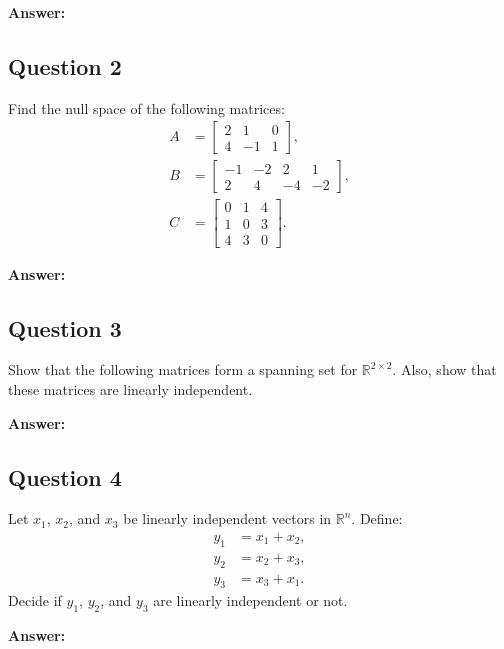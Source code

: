 \documentclass{article}
\begin{document}
\textbf{Answer:} 


\subsection*{Question 2}
Find the null space of the following matrices:
\begin{align*}
A &= \begin{bmatrix} 2 & 1 & 0 \\ 4 & -1 & 1 \end{bmatrix}, \\
B &= \begin{bmatrix} -1 & -2 & 2 & 1 \\ 2 & 4 & -4 & -2 \end{bmatrix}, \\
C &= \begin{bmatrix} 0 & 1 & 4 \\ 1 & 0 & 3 \\ 4 & 3 & 0 \end{bmatrix}.
\end{align*}

\textbf{Answer:} 


\subsection*{Question 3}
Show that the following matrices form a spanning set for \(\mathbb{R}^{2 \times 2}\). Also, show that these matrices are linearly independent.


\textbf{Answer:} 


\subsection*{Question 4}
Let \(x_{1}\), \(x_{2}\), and \(x_{3}\) be linearly independent vectors in \(\mathbb{R}^{n}\). Define:
\begin{align*}
y_{1} &= x_{1} + x_{2}, \\
y_{2} &= x_{2} + x_{3}, \\
y_{3} &= x_{3} + x_{1}.
\end{align*}
Decide if \(y_{1}\), \(y_{2}\), and \(y_{3}\) are linearly independent or not.

\textbf{Answer:} 

\end{document}
